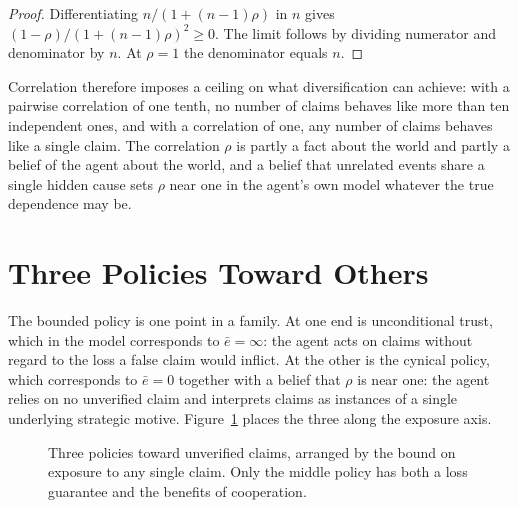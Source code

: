 \documentclass[11pt]{article}
\theoremstyle{definition}
\begin{document}
\begin{proof}
Differentiating $n/(1+(n-1)\rho)$ in $n$ gives $(1-\rho)/(1+(n-1)\rho)^2\ge 0$. The limit follows by dividing numerator and denominator by $n$. At $\rho=1$ the denominator equals $n$.
\end{proof}

Correlation therefore imposes a ceiling on what diversification can achieve: with a pairwise correlation of one tenth, no number of claims behaves like more than ten independent ones, and with a correlation of one, any number of claims behaves like a single claim. The correlation $\rho$ is partly a fact about the world and partly a belief of the agent about the world, and a belief that unrelated events share a single hidden cause sets $\rho$ near one in the agent's own model whatever the true dependence may be.

\section{Three Policies Toward Others}
\label{sec:policies}

The bounded policy is one point in a family. At one end is unconditional trust, which in the model corresponds to $\bar e=\infty$: the agent acts on claims without regard to the loss a false claim would inflict. At the other is the cynical policy, which corresponds to $\bar e=0$ together with a belief that $\rho$ is near one: the agent relies on no unverified claim and interprets claims as instances of a single underlying strategic motive. Figure~\ref{fig:policies} places the three along the exposure axis.

\begin{figure}[htbp]
\centering
{}
\caption{Three policies toward unverified claims, arranged by the bound on exposure to any single claim. Only the middle policy has both a loss guarantee and the benefits of cooperation.}
\label{fig:policies}
\end{figure}
\end{document}
